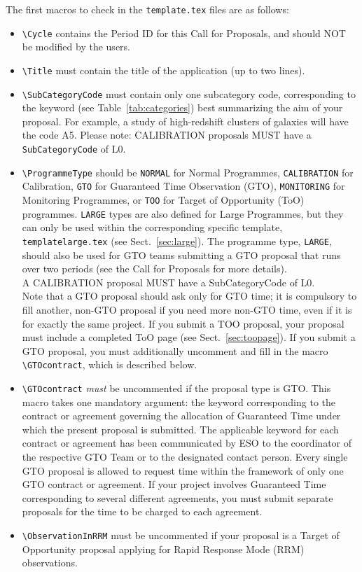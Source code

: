 \documentclass{article}
\begin{document}
The first macros to check in the {\tt template.tex} files are as follows:
\begin{itemize}
\item \verb|\Cycle| contains the Period ID for this Call for
  Proposals, and should NOT be modified by the users.
\item \verb|\Title| must contain the title of the application (up to
  two lines).
\item \verb|\SubCategoryCode| must contain only one subcategory code,
  corresponding to the keyword (see Table~\ref{tab:categories}) best
  summarizing the aim of your proposal. 
  For example, a study of
  high-redshift clusters of galaxies will have the code A5. 
  Please note: CALIBRATION proposals MUST have a \verb|SubCategoryCode| of L0.
\item \verb|\ProgrammeType| should be {\tt NORMAL} for Normal Programmes, 
 {\tt CALIBRATION} for Calibration, {\tt GTO} for Guaranteed Time Observation 
 (GTO), {\tt MONITORING} for Monitoring Programmes, or {\tt TOO} for Target of 
 Opportunity (ToO) programmes.  
 {\tt LARGE} types are also defined for Large Programmes, but they can only be 
 used within the corresponding specific template, {\tt templatelarge.tex} 
 (see Sect.~\ref{sec:large}). The programme type, {\tt LARGE}, should also be used 
 for GTO teams submitting a GTO proposal that runs over two periods (see the Call for Proposals
for more details). \\
  A CALIBRATION proposal MUST have a SubCategoryCode of L0.\\
  Note that a GTO proposal should ask only for GTO time; it is
  compulsory to fill another, non-GTO proposal if you need more non-GTO
  time, even if it is for exactly the same project. If you submit a
  TOO proposal, your proposal must include a completed ToO page
  (see Sect.~\ref{sec:toopage}). If you submit a GTO proposal, you
  must additionally uncomment and fill in the macro
  \verb|\GTOcontract|, which is described below.
\item \verb|\GTOcontract| {\em must\/} be uncommented if the proposal
  type is GTO. This macro takes one mandatory argument: 
  the keyword corresponding to the contract or agreement
  governing the allocation of Guaranteed Time under which the present
  proposal is submitted. The applicable keyword for each contract or
  agreement has been communicated by ESO to the coordinator of the
  respective GTO Team or to the designated contact person. Every
  single GTO proposal is allowed to request time within the framework
  of only one GTO contract or agreement. If your project involves
  Guaranteed Time corresponding to several different agreements, you
  must submit separate proposals for the time to be charged to each
  agreement. 
\item \verb|\ObservationInRRM| must be uncommented if your proposal is
  a Target of Opportunity proposal applying for Rapid Response Mode
  (RRM) observations.
\end{itemize}
\end{document}
